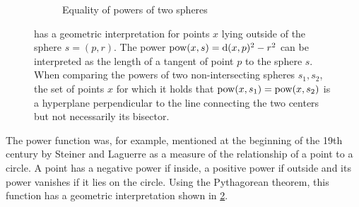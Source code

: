 \begin{figure}[tb]
\begin{subfigure}[b]{.45\linewidth}
        \caption{Equality of powers of two spheres}
        \label{sfig:chordal}
    \end{subfigure}
    \caption{ has a geometric interpretation for points $x$ lying outside of the sphere $s=(p, r)$. The power $\operatorname{pow}(x, s) = \operatorname{d}(x, p)^2 - r^2$ can be interpreted as the length of a tangent of point $p$ to the sphere $s$. When comparing the powers of two non-intersecting spheres $s_1, s_2$, the set of points $x$ for which it holds that $\operatorname{pow}(x, s_1) = \operatorname{pow}(x, s_2)$ is a hyperplane perpendicular to the line connecting the two centers but not necessarily its bisector.}
    \label{fig:power}
\end{figure}

The power function was, for example, mentioned at the beginning of the 19th century by Steiner \cite{steiner1881jacob} and Laguerre \cite{blaschke2013vorlesungen} as a measure of the relationship of a point to a circle.
A point has a negative power if inside, a positive power if outside and its power vanishes if it lies on the circle.
Using the Pythagorean theorem, this function has a geometric interpretation shown in \cref{fig:power}.

